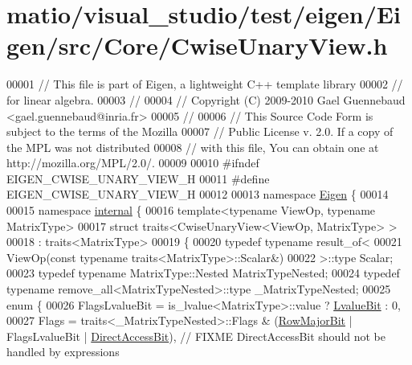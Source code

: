 \hypertarget{matio_2visual__studio_2test_2eigen_2_eigen_2src_2_core_2_cwise_unary_view_8h_source}{}\section{matio/visual\+\_\+studio/test/eigen/\+Eigen/src/\+Core/\+Cwise\+Unary\+View.h}
\label{matio_2visual__studio_2test_2eigen_2_eigen_2src_2_core_2_cwise_unary_view_8h_source}

\begin{DoxyCode}
00001 \textcolor{comment}{// This file is part of Eigen, a lightweight C++ template library}
00002 \textcolor{comment}{// for linear algebra.}
00003 \textcolor{comment}{//}
00004 \textcolor{comment}{// Copyright (C) 2009-2010 Gael Guennebaud <gael.guennebaud@inria.fr>}
00005 \textcolor{comment}{//}
00006 \textcolor{comment}{// This Source Code Form is subject to the terms of the Mozilla}
00007 \textcolor{comment}{// Public License v. 2.0. If a copy of the MPL was not distributed}
00008 \textcolor{comment}{// with this file, You can obtain one at http://mozilla.org/MPL/2.0/.}
00009 
00010 \textcolor{preprocessor}{#ifndef EIGEN\_CWISE\_UNARY\_VIEW\_H}
00011 \textcolor{preprocessor}{#define EIGEN\_CWISE\_UNARY\_VIEW\_H}
00012 
00013 \textcolor{keyword}{namespace }\hyperlink{namespace_eigen}{Eigen} \{
00014 
00015 \textcolor{keyword}{namespace }\hyperlink{namespaceinternal}{internal} \{
00016 \textcolor{keyword}{template}<\textcolor{keyword}{typename} ViewOp, \textcolor{keyword}{typename} MatrixType>
00017 \textcolor{keyword}{struct }traits<CwiseUnaryView<ViewOp, MatrixType> >
00018  : traits<MatrixType>
00019 \{
00020   \textcolor{keyword}{typedef} \textcolor{keyword}{typename} result\_of<
00021                      ViewOp(\textcolor{keyword}{const} \textcolor{keyword}{typename} traits<MatrixType>::Scalar&)
00022                    >::type Scalar;
00023   \textcolor{keyword}{typedef} \textcolor{keyword}{typename} MatrixType::Nested MatrixTypeNested;
00024   \textcolor{keyword}{typedef} \textcolor{keyword}{typename} remove\_all<MatrixTypeNested>::type \_MatrixTypeNested;
00025   \textcolor{keyword}{enum} \{
00026     FlagsLvalueBit = is\_lvalue<MatrixType>::value ? \hyperlink{group__flags_gae2c323957f20dfdc6cb8f44428eaec1a}{LvalueBit} : 0,
00027     Flags = traits<\_MatrixTypeNested>::Flags & (\hyperlink{group__flags_gae4f56c2a60bbe4bd2e44c5b19cbe8762}{RowMajorBit} | FlagsLvalueBit | 
      \hyperlink{group__flags_gabf1e9d0516a933445a4c307ad8f14915}{DirectAccessBit}), \textcolor{comment}{// FIXME DirectAccessBit should not be handled by expressions}

\end{DoxyCode}
